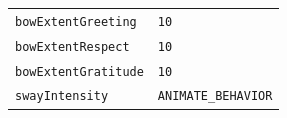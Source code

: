 \documentclass{CSSRforAfrica}
\begin{document}
\begin{table}[H]
\begin{tabular}{l l}
{\footnotesize \verb+bowExtentGreeting+} 	                                  & {\footnotesize \verb+10+} \vspace{-1.5mm}\\
{\footnotesize \verb+bowExtentRespect+} 	                                  & {\footnotesize \verb+10+} \vspace{-1.5mm}\\
{\footnotesize \verb+bowExtentGratitude+} 	                                  & {\footnotesize \verb+10+} \vspace{-1.5mm}\\
{\footnotesize \verb+swayIntensity+} 	                                         & {\footnotesize \verb+ANIMATE_BEHAVIOR+} \vspace{-1.5mm}\\
\end{tabular}
\vspace{-5mm}
\end{table}
  
\end{document}
